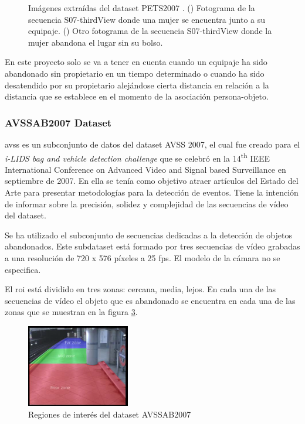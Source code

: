 \begin{figure}[ht]
\begin{subfigure}[b]{0.4\textwidth}
    \caption{}
    \label{fig:pets2007_4}
  \end{subfigure}
  \caption{Imágenes extraídas del dataset PETS2007 \cite{pets2007-dataset}.
    (\protect{}) Fotograma de la secuencia S07-thirdView donde una mujer se encuentra junto a su equipaje.
    (\protect{}) Otro fotograma de la secuencia S07-thirdView donde la mujer abandona el lugar sin su bolso.}
  \label{fig:pets2007_S07}
\end{figure}

En este proyecto solo se va a tener en cuenta cuando un equipaje ha sido abandonado sin propietario en un tiempo determinado o cuando ha sido desatendido por su propietario alejándose cierta distancia en relación a la distancia que se establece en el momento de la asociación persona-objeto.

\subsubsection{AVSSAB2007 Dataset}

\gls{avss} \cite{AVSSAB2007-dataset} es un subconjunto de datos del dataset AVSS 2007, el cual fue creado para el \textit{i-LIDS bag and vehicle detection challenge} que se celebró en la 14\textsuperscript{th} IEEE International Conference on Advanced Video and Signal based Surveillance en septiembre de 2007. En ella se tenía como objetivo atraer artículos del Estado del Arte para presentar metodologías para la detección de eventos. Tiene la intención de informar sobre la precisión, solidez y complejidad de las secuencias de vídeo del dataset.

Se ha utilizado el subconjunto de secuencias dedicadas a la detección de objetos abandonados. Este subdataset está formado por tres secuencias de vídeo grabadas a una resolución de 720 x 576 píxeles a 25 \gls{fps}. El modelo de la cámara no se especifica.

El \gls{roi} está dividido en tres zonas: cercana, media, lejos. En cada una de las secuencias de vídeo el objeto que es abandonado se encuentra en cada una de las zonas que se muestran en la figura \ref{fig:avssab2007-zones}.

\begin{figure}[ht]
\centering
\includegraphics[width=0.4\textwidth]{img/chapters/resultados/datasets/avssab2007-zones.png}
\caption{\label{fig:avssab2007-zones}Regiones de interés del dataset AVSSAB2007 \cite{AVSSAB2007-dataset}}
\end{figure}

